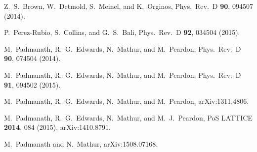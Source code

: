 \documentclass[showkeys,aps,twocolumn,showpacs,preprintnumbers,amsmath,amssymb,prd,letterpaper,floatfix,nofootinbib,superscriptaddress,]{revtex4-1}
\begin{document}
{\begin{thebibliography}{99}
  Z.~S.~Brown,  W.~Detmold, S.~Meinel, and K.~Orginos,
  Phys.\ Rev.\ D {\bf 90}, 094507 (2014).

  P.~Perez-Rubio, S.~Collins, and G.~S.~Bali,
  Phys.\ Rev.\ D {\bf 92}, 034504 (2015).

  M.~Padmanath, R.~G.~Edwards, N.~Mathur, and M.~Peardon,
  Phys.\ Rev.\ D {\bf 90}, 074504 (2014).

  M.~Padmanath, R.~G.~Edwards, N.~Mathur, and M.~Peardon,
  Phys.\ Rev.\ D {\bf 91}, 094502 (2015).


  M.~Padmanath, R.~G.~Edwards, N.~Mathur, and M.~Peardon,
   arXiv:1311.4806.

  M.~Padmanath, R.~G.~Edwards, N.~Mathur, and M.~J.~Peardon,
  PoS LATTICE {\bf 2014}, 084 (2015), arXiv:1410.8791.

  M.~Padmanath and N.~Mathur,
  arXiv:1508.07168.




\end{thebibliography}}
\end{document}
